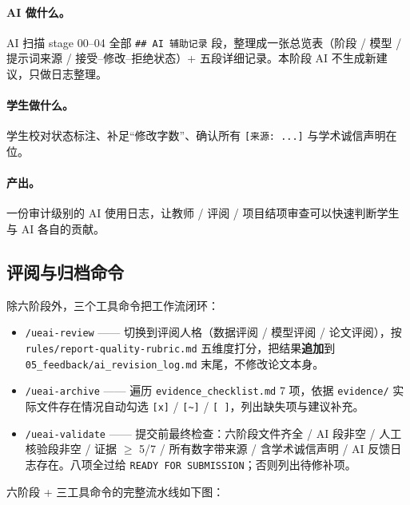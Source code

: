 \documentclass[12pt,a4paper]{article}
\begin{document}
\paragraph{AI 做什么。}AI 扫描 stage 00–04 全部 \texttt{\#\# AI 辅助记录} 段，整理成一张总览表（阶段 / 模型 / 提示词来源 / 接受–修改–拒绝状态）+ 五段详细记录。本阶段 AI 不生成新建议，只做日志整理。

\paragraph{学生做什么。}学生校对状态标注、补足``修改字数''、确认所有 \texttt{[来源: ...]} 与学术诚信声明在位。

\paragraph{产出。}一份审计级别的 AI 使用日志，让教师 / 评阅 / 项目结项审查可以快速判断学生与 AI 各自的贡献。

\subsection{评阅与归档命令}

除六阶段外，三个工具命令把工作流闭环：

\begin{itemize}[leftmargin=*]
  \item \texttt{/ueai-review} —— 切换到评阅人格（数据评阅 / 模型评阅 / 论文评阅），按 \texttt{rules/report-quality-rubric.md} 五维度打分，把结果\textbf{追加}到 \texttt{05\_feedback/ai\_revision\_log.md} 末尾，不修改论文本身。
  \item \texttt{/ueai-archive} —— 遍历 \texttt{evidence\_checklist.md} 7 项，依据 \texttt{evidence/} 实际文件存在情况自动勾选 \texttt{[x]} / \texttt{[\textasciitilde]} / \texttt{[\,]}，列出缺失项与建议补充。
  \item \texttt{/ueai-validate} —— 提交前最终检查：六阶段文件齐全 / AI 段非空 / 人工核验段非空 / 证据 $\geq$ 5/7 / 所有数字带来源 / 含学术诚信声明 / AI 反馈日志存在。八项全过给 \texttt{READY FOR SUBMISSION}；否则列出待修补项。
\end{itemize}

\medskip
六阶段 + 三工具命令的完整流水线如下图：
\end{document}
